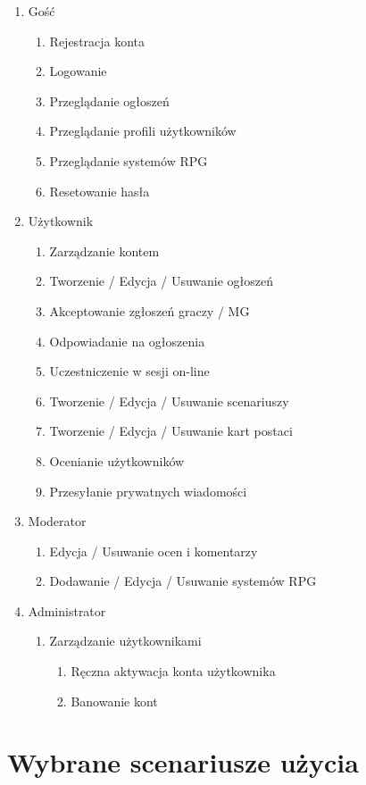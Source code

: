 \begin{enumerate}
\item Gość
	\begin{enumerate}
	\item Rejestracja konta
	\item Logowanie
	\item Przeglądanie ogłoszeń
	\item Przeglądanie profili użytkowników
	\item Przeglądanie systemów RPG
	\item Resetowanie hasła
	\end{enumerate}
\item Użytkownik
	\begin{enumerate}
	\item Zarządzanie kontem
	\item Tworzenie / Edycja / Usuwanie ogłoszeń
	\item Akceptowanie zgłoszeń graczy / MG
	\item Odpowiadanie na ogłoszenia
	\item Uczestniczenie w sesji on-line
	\item Tworzenie / Edycja / Usuwanie scenariuszy
	\item Tworzenie / Edycja / Usuwanie kart postaci
	\item Ocenianie użytkowników
	\item Przesyłanie prywatnych wiadomości
	\end{enumerate}
\item Moderator
	\begin{enumerate}
	\item Edycja / Usuwanie ocen i komentarzy
	\item Dodawanie / Edycja / Usuwanie systemów RPG
	\end{enumerate}
\item Administrator
	\begin{enumerate}
	\item Zarządzanie użytkownikami
		\begin{enumerate}
		\item Ręczna aktywacja konta użytkownika
		\item Banowanie kont
		\end{enumerate}
	\end{enumerate}
\end{enumerate}



\clearpage
\section{Wybrane scenariusze użycia}
\label{sec:scenariusze}


